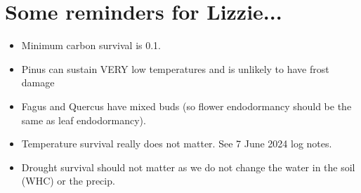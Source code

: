 \documentclass[11pt,letter]{article}
\begin{document}
\newpage
\section{Some reminders for Lizzie... }
\begin{itemize}
\item Minimum carbon survival is 0.1. 
\item Pinus can sustain VERY low temperatures and is unlikely to have frost damage
\item Fagus and Quercus have mixed buds (so flower endodormancy should be the same as leaf endodormancy).
\item Temperature survival really does not matter. See 7 June 2024 log notes.
\item Drought survival should not matter as we do not change the water in the soil (WHC) or the precip. 
\end{itemize}
\end{document}
